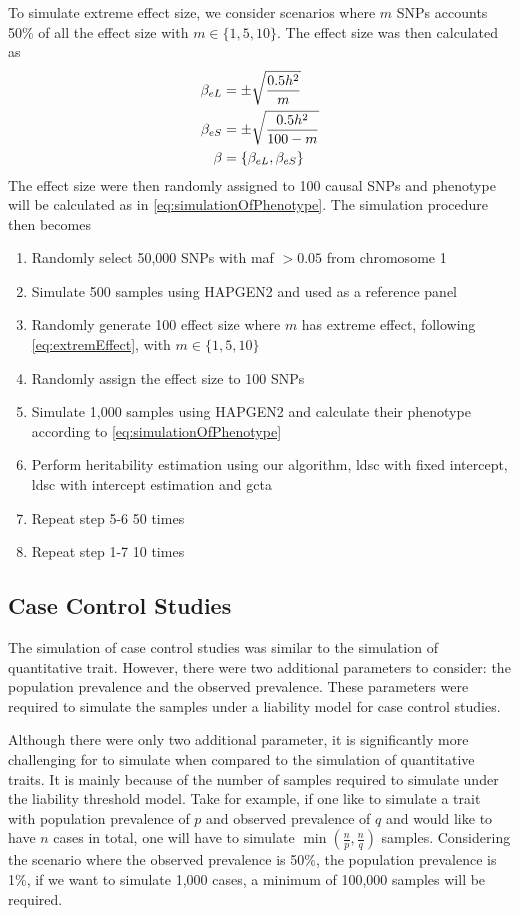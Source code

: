 		To simulate extreme effect size, we consider scenarios where $m$ \glspl{SNP} accounts 50\% of all the effect size with $m\in\{1,5,10\}$.
		The effect size was then calculated as
		\begin{align}
		\beta_{eL} &= \pm\sqrt{\frac{0.5h^2}{m}} \notag\\
		\beta_{eS} &= \pm\sqrt{\frac{0.5h^2}{100-m}} \notag\\
		\beta &= \{\beta_{eL}, \beta_{eS}\}
		\label{eq:extremEffect}
		\end{align}
		The effect size were then randomly assigned to 100 causal \glspl{SNP} and phenotype will be calculated as in \cref{eq:simulationOfPhenotype}.
		The simulation procedure then becomes
		\begin{enumerate}
			\item Randomly select 50,000 \glspl{SNP} with \gls{maf} $>0.05$ from chromosome 1
			\item Simulate 500 samples using HAPGEN2 and used as a reference panel
			\item Randomly generate 100 effect size where $m$ has extreme effect, following \cref{eq:extremEffect}, with $m\in\{1,5,10\}$
			\item Randomly assign the effect size to 100 \glspl{SNP}
			\item Simulate 1,000 samples using HAPGEN2 and calculate their phenotype according to \cref{eq:simulationOfPhenotype}
			\item Perform heritability estimation using our algorithm, \gls{ldsc} with fixed intercept, \gls{ldsc} with intercept estimation and \gls{gcta}
			\item Repeat step 5-6 50 times
			\item Repeat step 1-7 10 times
		\end{enumerate}
		
		\subsection{Case Control Studies}
		The simulation of case control studies was similar to the simulation of quantitative trait. 
		However, there were two additional parameters to consider: the population prevalence and the observed prevalence.
		These parameters were required to simulate the samples under a liability model for case control studies.

		Although there were only two additional parameter, it is significantly more challenging for to simulate when compared to the simulation of quantitative traits.
		It is mainly because of the number of samples required to simulate under the liability threshold model.
		Take for example, if one like to simulate a trait with population prevalence of $p$ and observed prevalence of $q$ and would like to have $n$ cases in total, one will have to simulate $\min(\frac{n}{p}, \frac{n}{q})$ samples.
		Considering the scenario where the observed prevalence is 50\%, the population prevalence is 1\%, if we want to simulate 1,000 cases, a minimum of 100,000 samples will be required.
		
